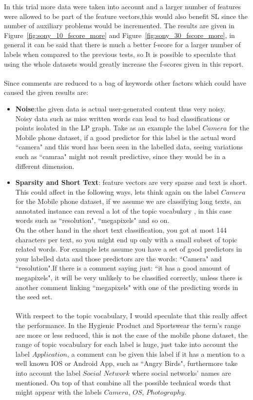 \documentclass[4pt,a4paper,twocolumn]{article}
\begin{document}
In this trial more data were taken into account and a larger number of features were allowed to be part of the feature vectors,this would also benefit SL since the number of auxiliary problems would be incremented.
The results are given in Figure~\ref{fig:sony_10_fscore_more} and Figure~\ref{fig:sony_30_fscore_more}, in general it can be said that there is much a better f-score for a larger number of labels when compared to the previous tests, so It is possible to speculate that using the whole datasets would greatly increase the f-scores given in this report.\\
\\

Since comments are reduced to a bag of keywords other factors which could have caused the given results are:
\begin{itemize}
\item \textbf{Noise}:the given data is actual user-generated content thus very noisy.\\
Noisy data such as miss written words can lead to bad classifications or points isolated in the LP graph. Take as an example the label $Camera$ for the Mobile phone dataset, if a good predictor for this label is the actual word ``camera" and this word has been seen in the labelled data, seeing variations such as ``camraa" might not result predictive, since they would be in a different dimension.

\item \textbf{Sparsity and Short Text}: feature vectors are very sparse and text is short. This could affect in the following ways, lets think again on the label $Camera$ for the Mobile  phone dataset, if we assume we are classifying long texts, an annotated instance can reveal a lot of the topic vocabulary , in this case words such as ``resolution", ``megapixels" and so on.\\
On the other hand in the short text classification, you got at most 144 characters per text, so you might end up only with a small subset of topic related words.
For example lets assume you have a set of good predictors in your labelled data and those predictors are the words: ``Camera" and ``resolution".If there is a comment saying just: ``it has a good amount of megapixels", it will be very unlikely to be classified correctly, unless there is another comment linking ``megapixels" with one of the predicting words in the seed set.\\
\\
With respect to the topic vocabulary, I would speculate that this really affect the performance. In the Hygienic Product and  Sportswear the term's range are more or less reduced, this is not the case of the mobile phone dataset, the range of topic vocabulary for each label is huge, just take into account the label $Application$, a comment can be given this label if it has a mention to a well known IOS or Android App, such as ``Angry Birds", furthermore take into account the label $Social$ $Network$ where social networks' names are mentioned. On top of that combine all the possible technical words that might appear with the labels $Camera$, $OS$, $Photography$.

\end{itemize} 
\end{document}
